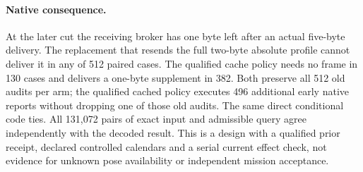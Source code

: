 \documentclass{article}
\begin{document}
\paragraph{Native consequence.}
At the later cut the receiving broker has one byte left after
an actual five-byte delivery. The replacement that resends
the full two-byte absolute profile cannot deliver it in any
of 512 paired cases. The qualified cache policy needs no
frame in 130 cases and delivers a one-byte supplement in
382. Both preserve all 512 old audits per arm; the qualified
cached policy executes 496 additional early native reports
without dropping one of those old audits. The same direct
conditional code ties. All 131,072 pairs of exact input and
admissible query agree independently with the decoded result.
This is a design with a qualified prior receipt, declared
controlled calendars and a serial current effect check, not
evidence for unknown pose availability or independent mission
acceptance.
\end{document}
